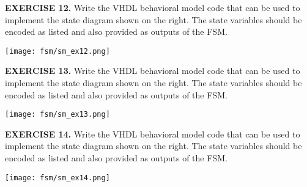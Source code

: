 \vspace{20pt}
\noindent
\begin{minipage}[t]{1\textwidth}
\textbf{EXERCISE 12.}
Write the VHDL behavioral model code that can be used to implement the state diagram shown on the right. The state variables should be encoded as listed and also provided as outputs of the FSM.
\end{minipage}
\begin{minipage}[t]{1\textwidth}
\vspace{10pt}
\centering
\texttt{[image: fsm/sm\_ex12.png]}
\end{minipage}

\vspace{20pt}
\noindent
\begin{minipage}[t]{0.5\textwidth}
\textbf{EXERCISE 13.}
Write the VHDL behavioral model code that can be used to implement the state diagram shown on the right. The state variables should be encoded as listed and also provided as outputs of the FSM.
\end{minipage}
\begin{minipage}[t]{0.47\textwidth}
\vspace{0pt}\raggedright
\centering
\texttt{[image: fsm/sm\_ex13.png]}
\end{minipage}

\vspace{20pt}
\noindent
\begin{minipage}[t]{0.5\textwidth}
\textbf{EXERCISE 14.}
Write the VHDL behavioral model code that can be used to implement the state diagram shown on the right. The state variables should be encoded as listed and also provided as outputs of the FSM.
\end{minipage}
\begin{minipage}[t]{0.47\textwidth}
\vspace{0pt}\raggedright
\centering
\texttt{[image: fsm/sm\_ex14.png]}
\end{minipage}



